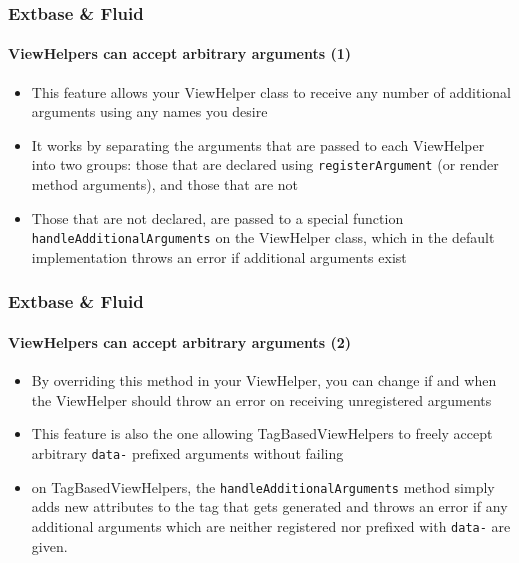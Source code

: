\begin{frame}[fragile]
	\frametitle{Extbase \& Fluid}
	\framesubtitle{ViewHelpers can accept arbitrary arguments (1)}

	\begin{itemize}

		\item This feature allows your ViewHelper class to receive any number of
			additional arguments using any names you desire

		\item It works by separating the arguments that are passed to each ViewHelper
			into two groups: those that are declared using \texttt{registerArgument}
			(or render method arguments), and those that are not

		\item Those that are not declared, are passed to a special function
			\texttt{handleAdditionalArguments}
			on the ViewHelper class, which in the default implementation throws an
			error if additional arguments exist

	\end{itemize}

\end{frame}


\begin{frame}[fragile]
	\frametitle{Extbase \& Fluid}
	\framesubtitle{ViewHelpers can accept arbitrary arguments (2)}

	\begin{itemize}

		\item By overriding this method in your ViewHelper, you can change if and
			when the ViewHelper should throw an error on receiving unregistered
			arguments

		\item This feature is also the one allowing TagBasedViewHelpers to freely
			accept arbitrary \texttt{data-} prefixed arguments without failing

		\item on TagBasedViewHelpers, the \texttt{handleAdditionalArguments} method
			simply adds new attributes to the tag that gets generated and throws an
			error if any additional arguments which are neither registered nor
			prefixed with \texttt{data-} are given.

	\end{itemize}

\end{frame}

